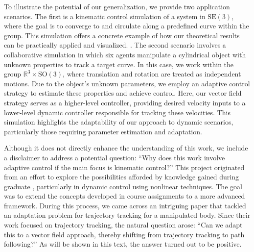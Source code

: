 To illustrate the potential of our generalization, we provide two application scenarios. The first is a kinematic control simulation of a system in $\text{SE}(3)$, where the goal is to converge to and circulate along a predefined curve within the group. This simulation offers a concrete example of how our theoretical results can be practically applied and visualized. . The second scenario involves a collaborative simulation in which six agents manipulate a cylindrical object with unknown properties to track a target curve. In this case, we work within the group $\mathbb{R}^3\times\text{SO}(3)$, where translation and rotation are treated as independent motions. Due to the object's unknown parameters, we employ an adaptive control strategy to estimate these properties and achieve control. Here, our vector field strategy serves as a higher-level controller, providing desired velocity inputs to a lower-level dynamic controller responsible for tracking these velocities. This simulation highlights the adaptability of our approach to dynamic scenarios, particularly those requiring parameter estimation and adaptation.

Although it does not directly enhance the understanding of this work, we include a disclaimer to address a potential question: ``Why does this work involve adaptive control if the main focus is kinematic control?'' This project originated from an effort to explore the possibilities afforded by knowledge gained during graduate , particularly in dynamic control using nonlinear techniques. The goal was to extend the concepts developed in course assignments to a more advanced framework. During this process, we came across an intriguing paper \citep{Culbertson2021} that tackled an adaptation problem for trajectory tracking for a manipulated body. Since their work focused on trajectory tracking, the natural question arose: ``Can we adapt this to a vector field approach, thereby shifting from trajectory tracking to path following?'' As will be shown in this text, the answer turned out to be positive.

